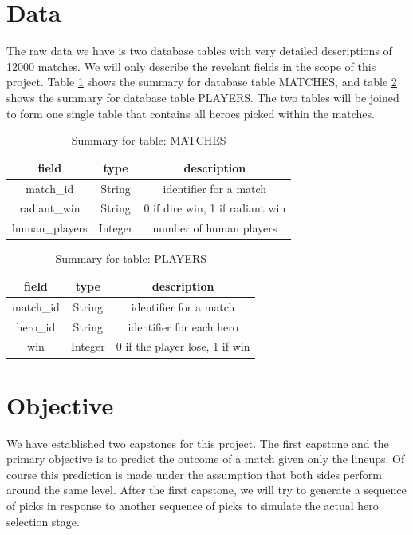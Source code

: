 \documentclass[11pt]{article}
\begin{document}
\section{Data}
The raw data we have is two database tables with very detailed descriptions of 12000 matches. We will only describe the revelant fields in the scope of this project. Table \ref{matches} shows the summary for database table MATCHES, and table \ref{players} shows the summary for database table PLAYERS. The two tables will be joined to form one single table that contains all heroes picked within the matches.

\begin{table}[h]
  \begin{center}
	\begin{tabular}{| c | c | c |}\hline
		field & type & description \\\hline
		match\_id & String & identifier for a match \\\hline
		radiant\_win & String & 0 if dire win, 1 if radiant win \\\hline
		human\_players & Integer & number of human players \\\hline
	\end{tabular}
	\caption{Summary for table: MATCHES}\label{matches}
  \end{center}
\end{table}

\begin{table}[h]
	\begin{center}
		\begin{tabular}{| c | c | c |}\hline
			field & type & description \\\hline
			match\_id & String & identifier for a match \\\hline
			hero\_id & String & identifier for each hero \\\hline
			win & Integer & 0 if the player lose, 1 if win \\\hline
		\end{tabular}
		\caption{Summary for table: PLAYERS}\label{players}
	\end{center}
\end{table}

\section{Objective}
We have established two capstones for this project. The first capstone and the primary objective is to predict the outcome of a match given only the lineups. Of course this prediction is made under the assumption that both sides perform around the same level. After the first capstone, we will try to generate a sequence of picks in response to another sequence of picks to simulate the actual hero selection stage.
\end{document}

